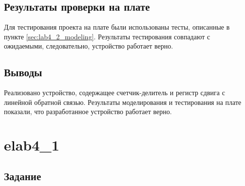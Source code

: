 \subsection{Результаты проверки на плате}

Для тестирования проекта на плате были использованы тесты, описанные в пункте \ref{sec:lab4_2_modeling}. Результаты тестирования совпадают с ожидаемыми, следовательно, устройство работает верно.

\subsection{Выводы}

Реализовано устройство, содержащее счетчик-делитель и регистр сдвига с линейной обратной связью. Результаты моделирования и тестирования на плате показали, что разработанное устройство работает верно.

\newpage

\section{elab4\_1}

\subsection{Задание}

